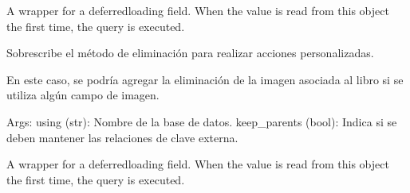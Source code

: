 \documentclass[letterpaper,10pt,spanish]{sphinxmanual}
\begin{document}
\begin{fulllineitems}
\begin{fulllineitems}
\end{fulllineitems}


\begin{fulllineitems}
\label{\detokenize{modules/appejemplares:appejemplares.models.Libro.categoria}}
\pysigstartsignatures
{}
\pysigstopsignatures
\sphinxAtStartPar
A wrapper for a deferred\sphinxhyphen{}loading field. When the value is read from this
object the first time, the query is executed.

\end{fulllineitems}


\begin{fulllineitems}
\label{\detokenize{modules/appejemplares:appejemplares.models.Libro.delete}}
\pysigstartsignatures
{}
\pysigstopsignatures
\sphinxAtStartPar
Sobrescribe el método de eliminación para realizar acciones personalizadas.

\sphinxAtStartPar
En este caso, se podría agregar la eliminación de la imagen asociada al libro si se utiliza algún campo de imagen.

\sphinxAtStartPar
Args:
\sphinxhyphen{} using (str): Nombre de la base de datos.
\sphinxhyphen{} keep\_parents (bool): Indica si se deben mantener las relaciones de clave externa.

\end{fulllineitems}


\begin{fulllineitems}
\label{\detokenize{modules/appejemplares:appejemplares.models.Libro.descripcion}}
\pysigstartsignatures
{}
\pysigstopsignatures
\sphinxAtStartPar
A wrapper for a deferred\sphinxhyphen{}loading field. When the value is read from this
object the first time, the query is executed.


\end{fulllineitems}
\end{fulllineitems}
\end{document}
